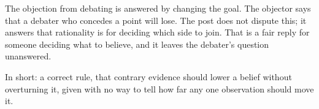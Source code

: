 \begin{afterword}
The objection from debating is answered by changing the goal. The objector says that a debater who concedes a point will lose. The post does not dispute this; it answers that rationality is for deciding which side to join. That is a fair reply for someone deciding what to believe, and it leaves the debater's question unanswered.

In short: a correct rule, that contrary evidence should lower a belief without overturning it, given with no way to tell how far any one observation should move it.
\end{afterword}
